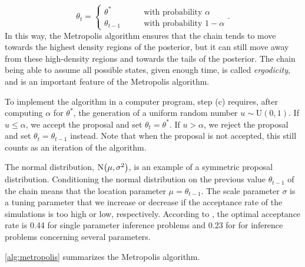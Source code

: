 \begin{enumerate}
\begin{itemize}
\begin{equation*}
            \theta_t = \begin{cases}
            \theta^* &\qquad \text{with probability } \alpha 
            \\
            \theta_{t-1} &\qquad \text{with probability } 1 - \alpha 
            \end{cases}.
        \end{equation*}
        In this way, the Metropolis algorithm ensures that the chain tends to move towards the highest density regions of the posterior, but it can still move away from these high-density regions and towards the tails of the posterior. The chain being able to assume all possible states, given enough time, is called \textit{ergodicity}, and is an important feature of the Metropolis algorithm. 
    \end{itemize}
\end{enumerate}

To implement the algorithm in a computer program, step (c) requires, after computing $\alpha$ for $\theta^*$, the generation of a uniform random number $u \sim \mathrm{U}(0,1)$. If $u \leq \alpha$, we accept the proposal and set $\theta_t = \theta^*$. If $u > \alpha$, we reject the proposal and set $\theta_t = \theta_{t-1}$ instead. Note that when the proposal is not accepted, this still counts as an iteration of the algorithm. 

The normal distribution, $\mathrm{N}\qty(\mu, \sigma^2)$, is an example of a symmetric proposal distribution. Conditioning the normal distribution on the previous value $\theta_{t-1}$ of the chain means that the location parameter $\mu=\theta_{t-1}$. The scale parameter $\sigma$ is a tuning parameter that we increase or decrease if the acceptance rate of the simulations is too high or low, respectively. According to \cite{BDA}, the optimal acceptance rate is 0.44 for single parameter inference problems and 0.23 for for inference problems concerning several parameters. 

\cref{alg:metropolis} summarizes the Metropolis algorithm.  

